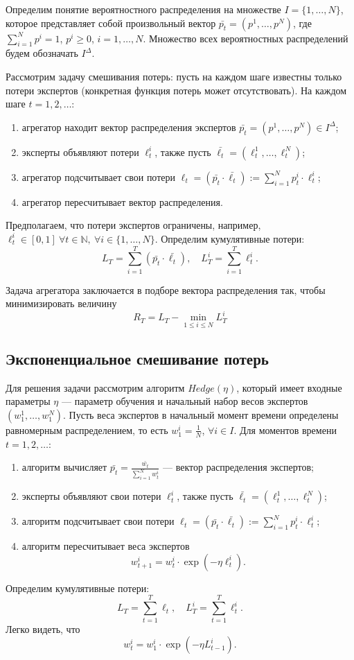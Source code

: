 \documentclass[a4paper,12pt]{article}
\newcommand{\N}{\mathbb{N}}
\theoremstyle{plain}
\theoremstyle{definition}
\theoremstyle{remark}
\numberwithin{equation}{section}
\begin{document}
Определим понятие вероятностного распределения на множестве $I = \{1, \dots, N\}$, которое представляет собой произвольный вектор $\bar{p_t} = (p^1, \dots, p^N)$, где $\sum\limits_{i=1}^{N}p^i = 1$, $p^i \geqslant 0$, $i = 1, \dots, N$. Множество всех вероятностных распределений будем обозначать $I^{\Delta}$.

Рассмотрим задачу смешивания потерь: пусть на каждом шаге известны только потери экспертов (конкретная функция потерь может отсутствовать). 
На каждом шаге $t = 1, 2, \dots$:
\begin{enumerate}
  \item агрегатор находит вектор распределения экспертов $\bar{p_t} = (p^1, \dots, p^N) \in I^\Delta$;
  \item эксперты объявляют потери $\ell_t^i$, также пусть $\bar{\ell_t} = (\ell_t^1, \dots, \ell_t^N)$;
  \item агрегатор подсчитывает свои потери $\ell_t = (\bar{p_t} \cdot \bar{\ell_t}) := \sum\limits_{i=1}^{N}p_t^i \cdot \ell_t^i$;
  \item агрегатор пересчитывает вектор распределения.
\end{enumerate}
Предполагаем, что потери экспертов ограничены, например, $\ell_t^i \in [0,1] \ \forall t \in \N, \ \forall i \in \{1, \dots, N\}$.
Определим кумулятивные потери:
\[L_T = \sum\limits_{i=1}^{T} (\bar{p_t} \cdot \bar{\ell_t}), \quad L_T^i = \sum\limits_{i=1}^{T} \ell_t^i.\]

Задача агрегатора заключается в подборе вектора распределения так, чтобы минимизировать величину
\[R_T = L_T - \min\limits_{1 \leqslant i \leqslant N} L_T^i\]


\subsection{Экспоненциальное смешивание потерь}
Для решения задачи рассмотрим алгоритм $Hedge(\eta)$, который имеет входные параметры $\eta$ — параметр обучения и начальный набор весов экспертов $(w_1^1, \dots, w_1^N)$.
Пусть веса экспертов в начальный момент времени определены равномерным распределением, то есть $w_1^i = \frac{1}{N}$, $\forall i \in I$.
Для моментов времени $t = 1, 2, \dots$:
\begin{enumerate}
  \item алгоритм вычисляет $\bar{p_t} = \frac{\bar{w_t}}{\sum\limits_{i=1}^{N}w_t^i}$ — вектор распределения экспертов;
  \item эксперты объявляют свои потери $\ell_t^i$, также пусть $\bar{\ell_t} = (\ell_t^1, \dots, \ell_t^N)$;
  \item алгоритм подсчитывает свои потери $\ell_t = (\bar{p_t} \cdot \bar{\ell_t}) := \sum\limits_{i=1}^{N}p_t^i \cdot \ell_t^i$;
  \item алгоритм пересчитывает веса экспертов $$w_{t+1}^i = w_t^i \cdot \exp\left(-\eta \ell_t^i\right).$$
\end{enumerate}
Определим кумулятивные потери:
\[L_T = \sum\limits_{t=1}^{T} \ell_t, \quad L_T^i = \sum\limits_{t=1}^{T} \ell_t^i.\]
Легко видеть, что
\[w_t^i = w_1^i \cdot \exp\left(-\eta L_{t-1}^i\right).\]
\end{document}
